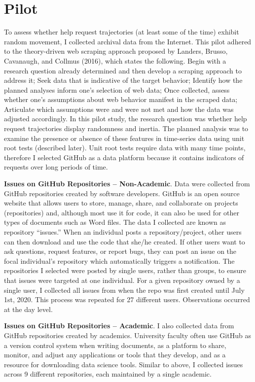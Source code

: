 \documentclass[english,,man]{apa6}
\begin{document}
\hypertarget{pilot}{%
\section{Pilot}\label{pilot}}

To assess whether help request trajectories (at least some of the time) exhibit random movement, I collected archival data from the Internet. This pilot adhered to the theory-driven web scraping approach proposed by Landers, Brusso, Cavanaugh, and Collmus (2016), which states the following. Begin with a research question already determined and then develop a scraping approach to address it; Seek data that is indicative of the target behavior; Identify how the planned analyses inform one's selection of web data; Once collected, assess whether one's assumptions about web behavior manifest in the scraped data; Articulate which assumptions were and were not met and how the data was adjusted accordingly. In this pilot study, the research question was whether help request trajectories display randomness and inertia. The planned analysis was to examine the presence or absence of these features in time-series data using unit root tests (described later). Unit root tests require data with many time points, therefore I selected GitHub as a data platform because it contains indicators of requests over long periods of time.

\textbf{Issues on GitHub Repositories -- Non-Academic}. Data were collected from GitHub repositories created by software developers. GitHub is an open source website that allows users to store, manage, share, and collaborate on projects (repositories) and, although most use it for code, it can also be used for other types of documents such as Word files. The data I collected are known as repository \enquote{issues.} When an individual posts a repository/project, other users can then download and use the code that she/he created. If other users want to ask questions, request features, or report bugs, they can post an issue on the focal individual's repository which automatically triggers a notification. The repositories I selected were posted by single users, rather than groups, to ensure that issues were targeted at one individual. For a given repository owned by a single user, I collected all issues from when the repo was first created until July 1st, 2020. This process was repeated for 27 different users. Observations occurred at the day level.

\textbf{Issues on GitHub Repositories -- Academic}. I also collected data from GitHub repositories created by academics. University faculty often use GitHub as a version control system when writing documents, as a platform to share, monitor, and adjust any applications or tools that they develop, and as a resource for downloading data science tools. Similar to above, I collected issues across 9 different repositories, each maintained by a single academic.
\end{document}
